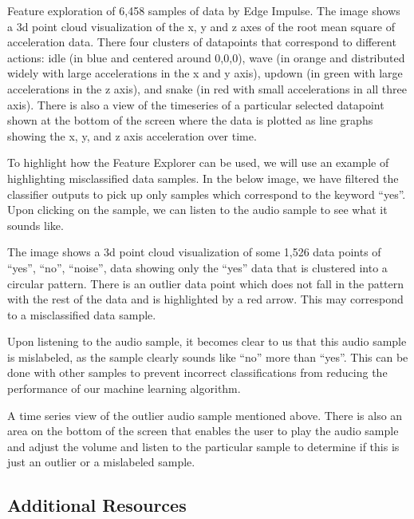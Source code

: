     
    Feature exploration of 6,458 samples of data by Edge Impulse. The image shows a 3d point cloud visualization of the x, y and z axes of the root mean square of acceleration data. There four clusters of datapoints that correspond to different actions: idle (in blue and centered around 0,0,0), wave (in orange and distributed widely with large accelerations in the x and y axis), updown (in green with large accelerations in the z axis), and snake (in red with small accelerations in all three axis). There is also a view of the timeseries of a particular selected datapoint shown at the bottom of the screen where the data is plotted as line graphs showing the x, y, and z axis acceleration over time.
    
    To highlight how the Feature Explorer can be used, we will use an example of highlighting misclassified data samples. In the below image, we have filtered the classifier outputs to pick up only samples which correspond to the keyword “yes”. Upon clicking on the sample, we can listen to the audio sample to see what it sounds like.
    
    
    The image shows a 3d point cloud visualization of some 1,526 data points of “yes”, “no”, “noise”, data showing only the “yes” data that is clustered into a circular pattern. There is an outlier data point which does not fall in the pattern with the rest of the data and is highlighted by a red arrow. This may correspond to a misclassified data sample.
    
    Upon listening to the audio sample, it becomes clear to us that this audio sample is mislabeled, as the sample clearly sounds like “no” more than “yes”. This can be done with other samples to prevent incorrect classifications from reducing the performance of our machine learning algorithm.
   
    
    A time series view of the outlier audio sample mentioned above. There is also an area on the bottom of the screen that enables the user to play the audio sample and adjust the volume and listen to the particular sample to determine if this is just an outlier or a mislabeled sample.
    
\subsection{Additional Resources}

